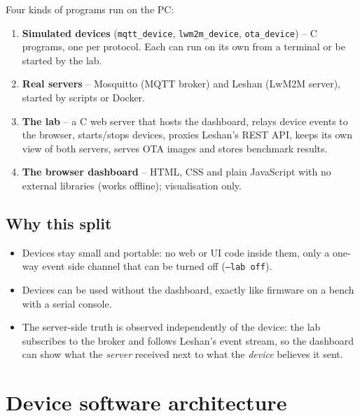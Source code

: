 \documentclass[11pt,a4paper]{article}
\newcommand{\code}[1]{\texttt{#1}}
\begin{document}
Four kinds of programs run on the PC:
\begin{enumerate}
  \item \textbf{Simulated devices} (\code{mqtt\_device}, \code{lwm2m\_device},
        \code{ota\_device}) -- C programs, one per protocol. Each can run on
        its own from a terminal or be started by the lab.
  \item \textbf{Real servers} -- Mosquitto (MQTT broker) and Leshan (LwM2M
        server), started by scripts or Docker.
  \item \textbf{The lab} -- a C web server that hosts the dashboard, relays
        device events to the browser, starts/stops devices, proxies Leshan's
        REST API, keeps its own view of both servers, serves OTA images and
        stores benchmark results.
  \item \textbf{The browser dashboard} -- HTML, CSS and plain JavaScript with
        no external libraries (works offline); visualisation only.
\end{enumerate}

\subsection{Why this split}
\begin{itemize}
  \item Devices stay small and portable: no web or UI code inside them, only
        a one-way event side channel that can be turned off (\code{--lab off}).
  \item Devices can be used without the dashboard, exactly like firmware on a
        bench with a serial console.
  \item The server-side truth is observed independently of the device: the
        lab subscribes to the broker and follows Leshan's event stream, so the
        dashboard can show what the \emph{server} received next to what the
        \emph{device} believes it sent.
\end{itemize}

\section{Device software architecture}
\end{document}
